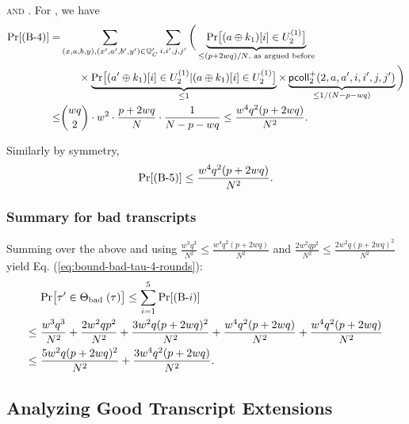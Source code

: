 \documentclass[journal=tosc,final,nohyperref]{iacrtrans}
\begin{document}
%




\arrangespace

\noindent\textsc{\bfour and \bfive}. For \bfour, we have
%
\begin{align*}
\Pr[\text{(B-4)}] 
=   &  \sum_{(x,a,b,y),(x',a',b',y')\in\mathcal{Q}_{C}'}\sum_{i,i',j,j'}\bigg(\underbrace{{\Pr}\big[(a\oplus k_1)[i]\in U_2^{(1)}\big]}_{\leq(p+2wq)/N\text{, as argued before}}     \\
& \ \ \ \ \ \times
\underbrace{{\Pr}\big[(a'\oplus k_1)[i]\in U_2^{(1)}|(a\oplus k_1)[i]\in U_2^{(1)}\big]}_{\leq1}\times\underbrace{\mathsf{pcoll}_{2}^+(2,a,a',i,i',j,j')}_{\leq1/(N-p-wq)}   \bigg)      \\
\leq  &  {wq\choose 2}\cdot w^2\cdot\frac{p+2wq}{N}\cdot\frac{1}{N-p-wq}\leq
\frac{w^4q^2(p+2wq)}{N^2}.
\end{align*}
%

Similarly by symmetry,
%
\begin{align*}
\Pr[\text{(B-5)}] 
\leq
\frac{w^4q^2(p+2wq)}{N^2}.
\end{align*}




\subsubsection{Summary for bad transcripts}


Summing over the above and using $\frac{w^3q^3}{N^2}\leq\frac{w^4q^2(p+2wq)}{N^2}$ and $\frac{2w^{2} q p^2}{N^{2}}\leq\frac{2w^2q(p+2wq)^2}{N^2}$ yield Eq. (\ref{eq:bound-bad-tau-4-rounds}):
%
\begin{align*}
&  {\Pr}\big[ \tau' \in \Theta_{\text {bad }}(\tau)\big]  \leq \sum_{i=1}^{5}\Pr[\text{(B-}i)]       \\
\leq~  & \frac{w^3q^3}{N^2}+
\frac{2w^{2} q p^2}{N^{2}}+
\frac{3w^2q(p+2wq)^2}{N^2}+
\frac{w^4q^2(p+2wq)}{N^2}+
\frac{w^4q^2(p+2wq)}{N^2}             \\
\leq~  & \frac{5w^2q(p+2wq)^2}{N^2}+
\frac{3w^4q^2(p+2wq)}{N^2}.
\end{align*}
%






\subsection{Analyzing Good Transcript Extensions}
\label{sec:good-tau-4-rounds}
\end{document}
